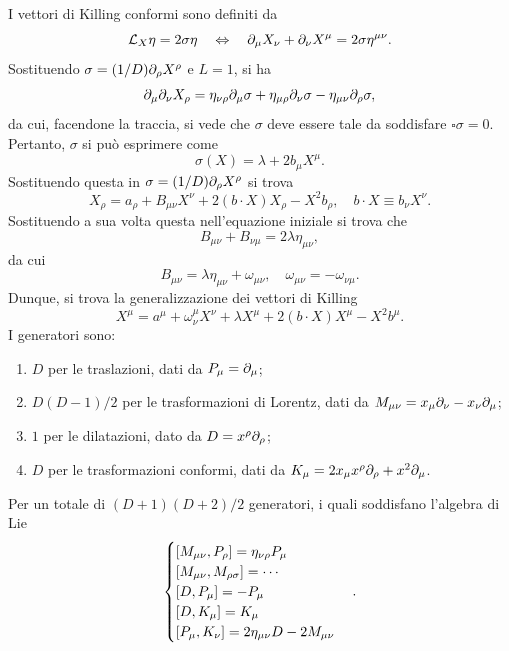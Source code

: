 I vettori di Killing conformi sono definiti da 
\begin{equation}
    \mathcal{L}_X\eta = 2\sigma\eta \quad\Leftrightarrow\quad \partial_\mu X_\nu + \partial_\nu X^\mu = 2\sigma\eta^{\mu\nu}.
\end{equation}
Sostituendo $\sigma = (1/D)\partial_\rho X^\rho$ e $L = 1$, si ha 
\begin{equation}
    \partial_\mu\partial_\nu X_\rho = \eta_{\nu\rho}\partial_\mu\sigma + \eta_{\mu\rho}\partial_\nu\sigma - \eta_{\mu\nu}\partial_\rho\sigma,
\end{equation}
da cui, facendone la traccia, si vede che $\sigma$ deve essere tale da soddisfare $\square\sigma = 0$. Pertanto, $\sigma$ si può esprimere come 
\begin{equation}
    \sigma(X) = \lambda + 2b_\mu X^\mu.
\end{equation}
Sostituendo questa in $\sigma = (1/D)\partial_\rho X^\rho$ si trova 
\begin{equation}
    X_\rho = a_\rho + B_{\mu\nu}X^\nu + 2(b \cdot X)X_\rho - X^2b_\rho,\quad b \cdot X \equiv b_\nu X^\nu.
\end{equation}
Sostituendo a sua volta questa nell'equazione iniziale si trova che
\begin{equation}
    B_{\mu\nu} + B_{\nu\mu} = 2\lambda\eta_{\mu\nu},    
\end{equation}
da cui 
\begin{equation}
    B_{\mu\nu} = \lambda\eta_{\mu\nu} + \omega_{\mu\nu},\quad \omega_{\mu\nu} = -\omega_{\nu\mu}.
\end{equation}
Dunque, si trova la generalizzazione dei vettori di Killing
\begin{equation}
    X^\mu = a^\mu + \omega^\mu_\nu X^\nu + \lambda X^\mu + 2(b\cdot X)X^\mu - X^2b^\mu.
\end{equation}
I generatori sono:
\begin{enumerate}
    \item $D$ per le traslazioni, dati da $P_\mu = \partial_\mu$;
    \item $D(D - 1)/2$ per le trasformazioni di Lorentz, dati da $M_{\mu\nu} = x_\mu\partial_\nu - x_\nu\partial_\mu$;
    \item $1$ per le dilatazioni, dato da $D = x^\rho\partial_\rho$;
    \item $D$ per le trasformazioni conformi, dati da $K_\mu = 2x_\mu x^\rho\partial_\rho + x^2\partial_\mu$. 
\end{enumerate}
Per un totale di $(D + 1)(D + 2)/2$ generatori, i quali soddisfano l'algebra di Lie 
\begin{equation}
    \begin{cases}
        \comm{M_{\mu\nu}}{P_\rho} = \eta_{\nu\rho}P_\mu \\
        \comm{M_{\mu\nu}}{M_{\rho\sigma}} = \cdots \\
        \comm{D}{P_\mu} = -P_\mu \\
        \comm{D}{K_\mu} = K_\mu \\
        \comm{P_\mu}{K_\nu} = 2\eta_{\mu\nu}D - 2M_{\mu\nu}
    \end{cases}.
\end{equation}
